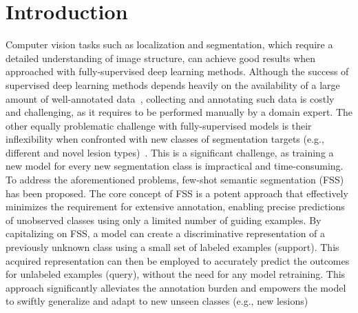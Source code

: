 \documentclass[runningheads]{llncs}
\begin{document}

\section{Introduction}
Computer vision tasks such as localization and segmentation, which require a detailed understanding of image structure, can achieve good results when approached with fully-supervised deep learning methods. Although the success of supervised deep learning methods depends heavily on the availability of a large amount of well-annotated data~\cite{chaitanya2020contrastive,azad2023advances}, collecting and annotating such data is costly and challenging, as it requires to be performed manually by a domain expert. The other equally problematic challenge with fully-supervised models is their inflexibility when confronted with new classes of segmentation targets (e.g., different and novel lesion types)~\cite{ouyang2022self,karimijafarbigloo2023mmcformer}. This is a significant challenge, as training a new model for every new segmentation class is impractical and time-consuming. To address the aforementioned problems, few-shot semantic segmentation (FSS) has been proposed.
The core concept of FSS is a potent approach that effectively minimizes the requirement for extensive annotation, enabling precise predictions of unobserved classes using only a limited number of guiding examples. By capitalizing on FSS, a model can create a discriminative representation of a previously unknown class using a small set of labeled examples (support). This acquired representation can then be employed to accurately predict the outcomes for unlabeled examples (query), without the need for any model retraining. 
This approach significantly alleviates the annotation burden and empowers the model to swiftly generalize and adapt to new unseen classes (e.g., new lesions)
\end{document}
